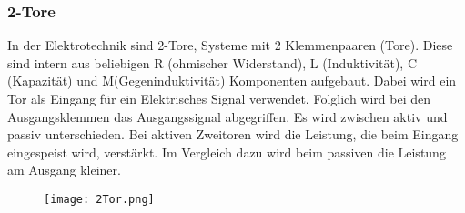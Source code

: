 \subsubsection{2-Tore} \label{subsubsec:2tore}

In der Elektrotechnik sind 2-Tore, Systeme mit 2 Klemmenpaaren (Tore). 
Diese sind intern aus beliebigen R (ohmischer Widerstand), L (Induktivität), C (Kapazität) und M(Gegeninduktivität) Komponenten aufgebaut. 
Dabei wird ein Tor als Eingang für ein Elektrisches Signal verwendet. Folglich wird bei den Ausgangsklemmen das Ausgangssignal abgegriffen. 
Es wird zwischen aktiv und passiv unterschieden.
Bei aktiven Zweitoren wird die Leistung, die beim Eingang eingespeist wird, verstärkt. 
Im Vergleich dazu wird beim passiven die Leistung am Ausgang kleiner.

\begin{figure}[H]
	\centering
	\texttt{[image: 2Tor.png]}
	\label{fig:übersicht}
\end{figure}